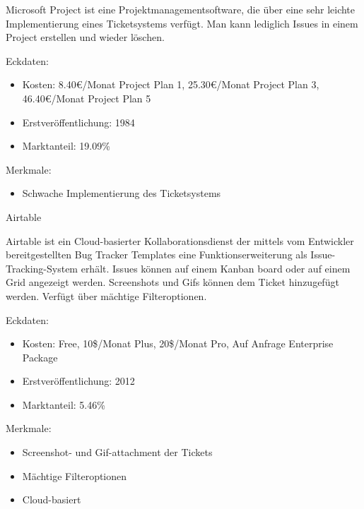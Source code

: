 				Microsoft Project ist eine Projektmanagementsoftware, die über eine sehr leichte Implementierung eines Ticketsystems verfügt. Man kann lediglich Issues in einem Project erstellen und wieder löschen.
				
				Eckdaten:
				\begin{itemize}
					\item Kosten: 8.40€/Monat Project Plan 1, 25.30€/Monat Project Plan 3, 46.40€/Monat Project Plan 5
					\item Erstveröffentlichung: 1984
					\item Marktanteil: 19.09\%
				\end{itemize}
				
				Merkmale:
				\begin{itemize}
					\item Schwache Implementierung des Ticketsystems
				\end{itemize}
				

				

				Airtable
				
Airtable ist ein Cloud-basierter Kollaborationsdienst der mittels vom Entwickler bereitgestellten Bug Tracker Templates eine Funktionserweiterung als Issue-Tracking-System erhält. Issues können auf einem Kanban board oder auf einem Grid angezeigt werden. Screenshots und Gifs können dem Ticket hinzugefügt werden. Verfügt über mächtige Filteroptionen.

				
					Eckdaten:
				\begin{itemize}
					\item Kosten: Free, 10\$/Monat Plus, 20\$/Monat Pro, Auf Anfrage Enterprise Package
					\item Erstveröffentlichung: 2012 
					\item Marktanteil: 5.46\%
				\end{itemize}
				
				Merkmale:
				\begin{itemize}
					\item Screenshot- und Gif-attachment der Tickets
					\item Mächtige Filteroptionen
					\item Cloud-basiert
				\end{itemize}
				


